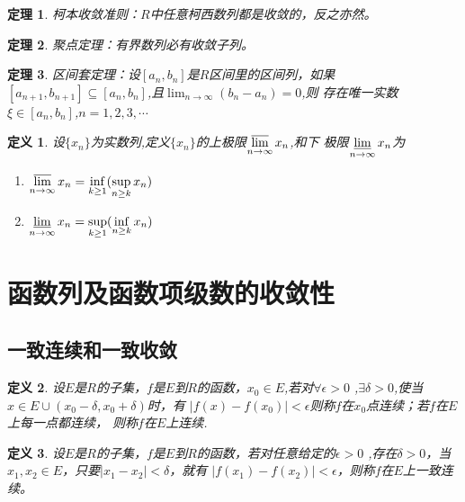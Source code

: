 \documentclass[UTF8]{ctexbook}
\newtheorem{definition}{定义}[chapter]
\newtheorem{thm}{定理}[chapter]
\begin{document}
\begin{thm}
    柯本收敛准则：$R$中任意柯西数列都是收敛的，反之亦然。
\end{thm}

\begin{thm}
    聚点定理：有界数列必有收敛子列。
\end{thm}

\begin{thm}
    区间套定理：设$[ a_n, b_n ] $是$R$区间里的区间列，如果$[a_{n+1},b_{n+1}]
    \subseteq [ a_n, b_n ]$,且$ \lim_{n \to \infty} (b_n - a_n) = 0$,则
    存在唯一实数$\xi \in [a_n, b_n]$,$ n = 1, 2,3 ,\cdots$
\end{thm}

\begin{definition}
    设$\{x_n\}$为实数列,定义$\{x_n\}$的上极限$\varlimsup\limits_{n \to \infty} x_n$,和下
    极限$\varliminf\limits_{n \to \infty} x_n$为
    \begin{enumerate}
        \item $\varlimsup\limits_{n \to \infty} x_n = \inf\limits_{k \geq 1}( \sup\limits_{n \geq k} x_n) $
        \item $\varliminf\limits_{n \to \infty} x_n = \sup\limits_{k \geq 1}( \inf\limits_{n \geq k} x_n) $
    \end{enumerate}
\end{definition}

\section{函数列及函数项级数的收敛性}
\subsection{一致连续和一致收敛}
\begin{definition}
    设$E$是$R$的子集，$f$是$E$到$R$的函数，$x_0 \in E$,若对$\forall \epsilon > 0$
    ,$\exists \delta>0$,使当$x \in E \cup (x_0-\delta,x_0+\delta)$时，有
    $|f(x) - f(x_0) |< \epsilon$则称$f$在$x_0$点连续；若$f$在$E$上每一点都连续，
    则称$f$在$E$上连续.
\end{definition}

\begin{definition}
    设$E$是$R$的子集，$f$是$E$到$R$的函数，若对任意给定的$\epsilon > 0$
    ,存在$\delta > 0$，当$x_1, x_2 \in E$，只要$|x_1 - x_2 |< \delta$，就有
    $| f(x_1) - f(x_2) | < \epsilon$，则称$f$在$E$上一致连续。
\end{definition}
\end{document}

